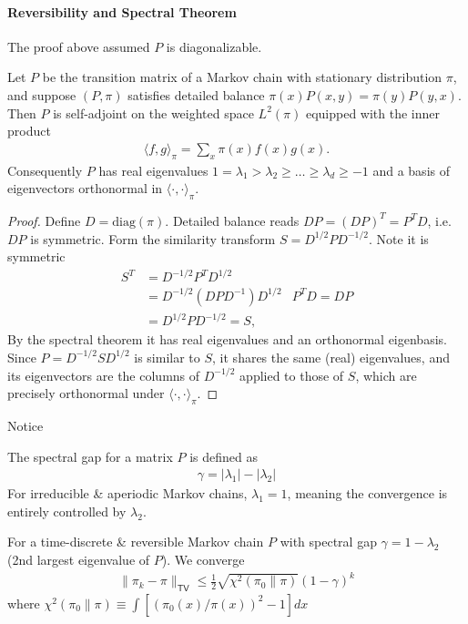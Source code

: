 \paragraph{Reversibility and Spectral Theorem}
The proof above assumed $P$ is diagonalizable.

\begin{fact}
	Let $P$ be the transition matrix of a Markov chain with stationary
	distribution $\pi$, and suppose $(P,\pi)$ satisfies detailed balance
	$\pi(x) P(x,y) = \pi(y) P(y,x)$. Then $P$ is self-adjoint on the weighted
	space $L^2(\pi)$ equipped with the inner product
	\begin{align}
		\langle f, g \rangle_\pi = \sum_x \pi(x) f(x) g(x).
	\end{align}
	Consequently $P$ has real eigenvalues
	$1 = \lambda_1 > \lambda_2 \geq \dots \geq \lambda_d \geq -1$
	and a basis of eigenvectors orthonormal in $\langle \cdot, \cdot \rangle_\pi$.
\end{fact}
\begin{proof}
	Define $D = \mathrm{diag}(\pi)$. Detailed balance reads
	$D P = (D P)^T = P^T D$, i.e. $DP$ is symmetric. Form the similarity
	transform $S = D^{1/2} P D^{-1/2}$. Note it is symmetric
	\begin{align}
		S^T & = D^{-1/2} P^T D^{1/2}\\
		    & = D^{-1/2} (D P D^{-1}) D^{1/2} & P^T D = D P\\
		    & = D^{1/2} P D^{-1/2} = S,
	\end{align}
	By the spectral theorem it has real eigenvalues and an orthonormal
	eigenbasis. Since $P = D^{-1/2} S D^{1/2}$ is similar to $S$, it shares the same (real) eigenvalues, and its eigenvectors are the columns of
	$D^{-1/2}$ applied to those of $S$, which are precisely orthonormal under
	$\langle \cdot, \cdot \rangle_\pi$.
\end{proof}
Notice  


\begin{definition}
	 The spectral gap for a matrix $P$ is defined as
	\begin{align}
		\gamma = |\lambda_1| - |\lambda_2|
	\end{align}
	For irreducible \& aperiodic Markov chains, $\lambda_1 = 1$, meaning the convergence is entirely controlled by $\lambda_2$.
\end{definition}

\begin{theorem}
	For a time-discrete \& reversible Markov chain $P$ with spectral gap $\gamma = 1 - \lambda_2$ (2nd largest eigenvalue of $P$). We converge 
	\begin{align}
		\|\pi_k - \pi\|_{\textsf{TV}} \leq  \frac{1}{2} \sqrt{\chi^2(\pi_0 \| \pi)} (1-\gamma)^k
	\end{align}
	where $\chi^2(\pi_0 \| \pi) \equiv \int [(\pi_0(x) / \pi(x))^2 - 1] dx$
\end{theorem}


